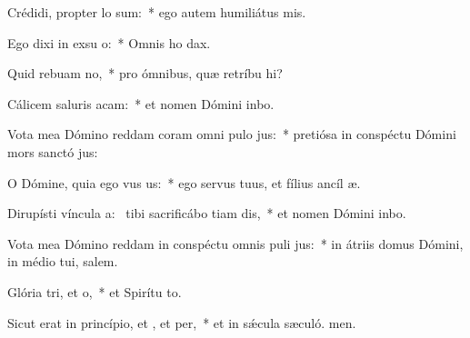 \item Crédidi, propter  lo sum:~* ego autem humiliátus  mis.
\item Ego dixi in exsu o:~* Omnis ho dax.
\item Quid rebuam no,~* pro ómnibus, quæ retríbu hi?
\item Cálicem saluris acam:~* et nomen Dómini inbo.
\item Vota mea Dómino reddam coram omni pulo jus:~* pretiósa in conspéctu Dómini mors sanctó jus:
\item O Dómine, quia ego vus us:~* ego servus tuus, et fílius ancíl æ.
\item Dirupísti víncula a:~\pscross{} tibi sacrificábo tiam dis,~* et nomen Dómini inbo.
\item Vota mea Dómino reddam in conspéctu omnis puli jus:~* in átriis domus Dómini, in médio tui, salem.
\item Glória tri, et o,~* et Spirítu to.
\item Sicut erat in princípio, et , et per,~* et in sǽcula sæculó. men.
